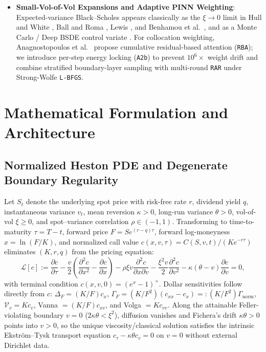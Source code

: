 \documentclass[11pt,a4paper]{article}
\begin{document}
\begin{itemize}
  \item \textbf{Small-Vol-of-Vol Expansions and Adaptive PINN Weighting}: Expected-variance Black--Scholes appears classically as the $\xi \to 0$ limit in Hull and White \cite{hull1987pricing}, Ball and Roma \cite{ball1994stochastic}, Lewis \cite{lewis2000option}, and Benhamou et al.\ \cite{benhamou2010time}, and as a Monte Carlo / Deep BSDE control variate \cite{takahashi2022control}. For collocation weighting, Anagnostopoulos et al.\ \cite{anagnostopoulos2024residual} propose cumulative residual-based attention (\texttt{RBA}); we introduce per-step energy locking (\texttt{A2b}) to prevent $10^6\times$ weight drift and combine stratified boundary-layer sampling with multi-round \texttt{RAR} \cite{lu2021deepxde} under Strong-Wolfe \texttt{L-BFGS}.
\end{itemize}

\section{Mathematical Formulation and Architecture}
\label{sec:method}

\subsection{Normalized Heston PDE and Degenerate Boundary Regularity}

Let $S_t$ denote the underlying spot price with risk-free rate $r$, dividend yield $q$, instantaneous variance $v_t$, mean reversion $\kappa > 0$, long-run variance $\theta > 0$, vol-of-vol $\xi \ge 0$, and spot--variance correlation $\rho \in (-1, 1)$. Transforming to time-to-maturity $\tau = T - t$, forward price $F = S e^{(r-q)\tau}$, forward log-moneyness $x = \ln(F/K)$, and normalized call value $c(x, v, \tau) = C(S, v, t)/(K e^{-r\tau})$ eliminates $(K, r, q)$ from the pricing equation:
\begin{equation}
  \mathcal{L}[c] := \frac{\partial c}{\partial \tau} - \frac{v}{2}\left(\frac{\partial^2 c}{\partial x^2} - \frac{\partial c}{\partial x}\right) - \rho\xi v \frac{\partial^2 c}{\partial x \partial v} - \frac{\xi^2 v}{2}\frac{\partial^2 c}{\partial v^2} - \kappa(\theta - v)\frac{\partial c}{\partial v} = 0,
  \label{eq:heston_pde}
\end{equation}
with terminal condition $c(x, v, 0) = (e^x - 1)^+$. Dollar sensitivities follow directly from $c$: $\Delta_F = (K/F) c_x$, $\Gamma_F = (K/F^2)(c_{xx} - c_x) =: (K/F^2)\Gamma_{\mathrm{norm}}$, $\mathcal{V}_v = K c_v$, Vanna $= (K/F) c_{xv}$, and Volga $= K c_{vv}$. Along the attainable Feller-violating boundary $v = 0$ ($2\kappa\theta < \xi^2$), diffusion vanishes and Fichera's drift $\kappa\theta > 0$ points into $v > 0$, so the unique viscosity/classical solution satisfies the intrinsic Ekstr\"om--Tysk \cite{ekstrom2010black} transport equation $c_\tau - \kappa\theta c_v = 0$ on $v = 0$ without external Dirichlet data.
\end{document}
